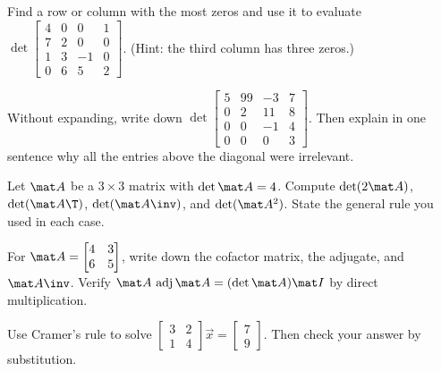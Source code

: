 \begin{exercise}\label{ch22:ex-zeros}
Find a row or column with the most zeros and use it to evaluate
$\det\begin{bmatrix} 4 & 0 & 0 & 1 \\ 7 & 2 & 0 & 0 \\ 1 & 3 & -1 & 0 \\ 0 & 6 & 5 & 2\end{bmatrix}$.
(Hint: the third column has three zeros.)
\end{exercise}

\begin{exercise}\label{ch22:ex-triangular}
Without expanding, write down $\det\begin{bmatrix} 5 & 99 & -3 & 7 \\ 0 & 2 & 11 & 8 \\ 0 & 0 & -1 & 4
\\ 0 & 0 & 0 & 3\end{bmatrix}$. Then explain in one sentence why all the entries above the diagonal
were irrelevant.
\end{exercise}

\begin{exercise}\label{ch22:ex-scaling}
Let $\mat A$ be a $3\times3$ matrix with $\det\mat A=4$. Compute $\det(2\mat A)$, $\det(\mat A\T)$,
$\det(\mat A\inv)$, and $\det(\mat A^2)$. State the general rule you used in each case.
\end{exercise}

\begin{exercise}\label{ch22:ex-adj2x2}
For $\mat A=\begin{bmatrix} 4 & 3 \\ 6 & 5\end{bmatrix}$, write down the cofactor matrix, the adjugate,
and $\mat A\inv$. Verify $\mat A\,\operatorname{adj}\mat A=(\det\mat A)\mat I$ by direct multiplication.
\end{exercise}

\begin{exercise}\label{ch22:ex-cramer2}
Use Cramer's rule to solve $\begin{bmatrix} 3 & 2 \\ 1 & 4\end{bmatrix}\vec x=\begin{bmatrix} 7 \\
9\end{bmatrix}$. Then check your answer by substitution.
\end{exercise}


